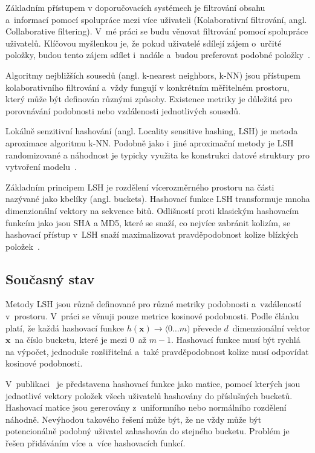 \documentclass[11pt]{article}
\begin{document}
Základním přístupem v doporučovacích systémech je filtrování obsahu a~informací pomocí spolupráce mezi více uživateli (Kolaborativní filtrování, angl. Collaborative filtering). V~mé práci se budu věnovat filtrování pomocí spolupráce uživatelů. Klíčovou myšlenkou je, že pokud uživatelé sdílejí zájem o~určité položky, budou tento zájem sdílet i~nadále a~budou preferovat podobné položky~\cite{xue2005scalable}.

Algoritmy nejbližších sousedů (angl. k-nearest neighbors, k-NN) jsou přístupem kolaborativního filtrování a~vždy fungují v konkrétním měřitelném prostoru, který může být definován různými způsoby. Existence metriky je důležitá pro porovnávání podobnosti nebo vzdálenosti jednotlivých sousedů.

Lokálně senzitivní hashování (angl. Locality sensitive hashing, LSH) je metoda aproximace algoritmu k-NN. Podobně jako i~jiné aproximační metody je LSH randomizované a náhodnost je typicky využita ke konstrukci datové struktury pro vytvoření modelu~\cite{shakhnarovich2006nearest}.

Základním principem LSH je rozdělení vícerozměrného prostoru na části nazývané
jako kbelíky (angl. buckets). Hashovací funkce LSH transformuje mnoha dimenzionální vektory na sekvence bitů. Odlišností proti klasickým hashovacím funkcím jako jsou SHA a MD5, které se snaží, co nejvíce zabránit kolizím, se hashovací přístup v~LSH snaží maximalizovat pravděpodobnost kolize blízkých položek~\cite{wang2014hashing}.
\subsection{Současný stav}
Metody LSH jsou různě definované pro různé metriky podobnosti a~vzdáleností v~prostoru. V~práci se věnuji pouze metrice kosinové podobnosti. Podle článku~\cite{argerich2017generic} platí, že každá hashovací funkce $h(\mathbf{x}) \to \langle0 \dots m ) $ převede $d$~dimenzionální vektor $\mathbf{x}$~na číslo bucketu, které je mezi $0$~až $m-1$. Hashovací funkce musí být rychlá na výpočet, jednoduše rozšiřitelná a~také pravděpodobnost kolize musí odpovídat kosinové podobnosti.

V~publikaci~\cite{argerich2017generic} je představena hashovací funkce jako matice, pomocí kterých jsou jednotlivé vektory položek všech uživatelů hashovány do příslušných bucketů. Hashovací matice jsou gererovány z~uniformního nebo normálního rozdělení náhodně. Nevýhodou takového řešení může být, že ne vždy může být potencionálně podobný uživatel zahashován do stejného bucketu. Problém je řešen přidáváním více a~více hashovacích funkcí. 
\end{document}
